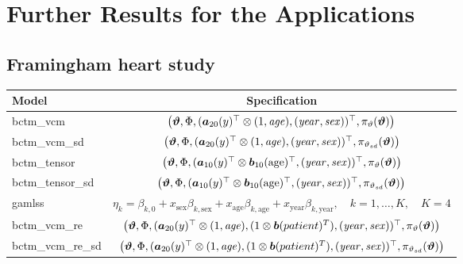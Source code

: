 \documentclass[12pt, a4paper]{article}
\begin{document}
\section{Further Results for the Applications}\label{supp:app}




\subsection{Framingham heart study}

\begin{table}[H]
    \centering\footnotesize
    \begin{tabular}{l|c}
    \hline\hline
         Model & Specification\\
         \hline 
        bctm\_vcm  & $\big( \text{\boldmath$\vartheta$},\Phi,\allowbreak (\text{\boldmath$a$}_{20}(y)^\top \otimes\allowbreak (1, \mathit{age}),\allowbreak (\mathit{year},\allowbreak \mathit{sex}) )^\top, \pi_\vartheta(\text{\boldmath$\vartheta$})\big)$ \\
        bctm\_vcm\_sd & $\big( \text{\boldmath$\vartheta$},\Phi,\allowbreak (\text{\boldmath$a$}_{20}(y)^\top \otimes\allowbreak (1, \mathit{age}),\allowbreak (\mathit{year},\allowbreak \mathit{sex}) )^\top, \pi_{\vartheta_{sd}}(\text{\boldmath$\vartheta$})\big)$ \\
        bctm\_tensor & $\big( \text{\boldmath$\vartheta$},\Phi, ( \text{\boldmath$a$}_{10}(y)^\top \otimes  \text{\boldmath$b$}_{10}(\mathrm{age})^\top, (\mathit{year}, \mathit{sex}))^\top,\allowbreak \pi_\vartheta(\text{\boldmath$\vartheta$})\big)$\\
        bctm\_tensor\_sd & $\big( \text{\boldmath$\vartheta$},\Phi, ( \text{\boldmath$a$}_{10}(y)^\top \otimes  \text{\boldmath$b$}_{10}(\mathrm{age})^\top, (\mathit{year}, \mathit{sex}))^\top,\allowbreak \pi_{\vartheta_{sd}}(\text{\boldmath$\vartheta$})\big)$\\
        gamlss &  $\eta_k  = \beta_{k,0}  + x_{\text{sex}} \beta_{k,\text{sex}}  + x_{\text{age}} \beta_{k,\text{age}}  + x_{\text{year}} \beta_{k,\text{year}}, \quad k=1,\ldots,K, \quad K=4$\\
        \hline
        bctm\_vcm\_re & $\big( \text{\boldmath$\vartheta$},\Phi,\allowbreak (\text{\boldmath$a$}_{20}(y)^\top \otimes\allowbreak (1, \mathit{age}), (1 \otimes \text{\boldmath$b$}(patient)^T), \allowbreak (\mathit{year},\allowbreak \mathit{sex}) )^\top, \pi_\vartheta(\text{\boldmath$\vartheta$})\big)$ \\
        bctm\_vcm\_re\_sd &  $\big( \text{\boldmath$\vartheta$},\Phi,\allowbreak (\text{\boldmath$a$}_{20}(y)^\top \otimes\allowbreak (1, \mathit{age}), (1 \otimes \text{\boldmath$b$}(patient)^T), \allowbreak (\mathit{year},\allowbreak \mathit{sex}) )^\top, \pi_{\vartheta_{sd}}(\text{\boldmath$\vartheta$})\big)$ \\

\end{tabular}
\end{table}
\end{document}
